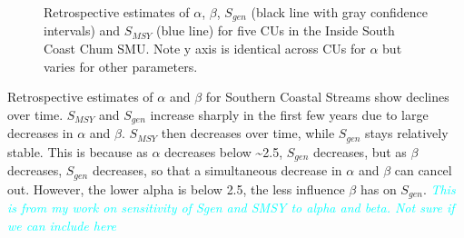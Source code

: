 \documentclass[11pt]{book}
\begin{document}
\begin{figure}[htb]

{\centering {} 

}

\caption{Retrospective estimates of $\alpha$, $\beta$, $S_{gen}$ (black line with gray confidence intervals) and $S_{MSY}$ (blue line) for five CUs in the Inside South Coast Chum SMU. Note y axis is identical across CUs for $\alpha$ but varies for other parameters.}\label{fig:chum-a-b-SMSY-Sgen-retro}
\end{figure}
Retrospective estimates of \(\alpha\) and \(\beta\) for Southern Coastal Streams show declines over time. \(S_{MSY}\) and \(S_{gen}\) increase sharply in the first few years due to large decreases in \(\alpha\) and \(\beta\). \(S_{MSY}\) then decreases over time, while \(S_{gen}\) stays relatively stable. This is because as \(\alpha\) decreases below \textasciitilde2.5, \(S_{gen}\) decreases, but as \(\beta\) decreases, \(S_{gen}\) decreases, so that a simultaneous decrease in \(\alpha\) and \(\beta\) can cancel out. However, the lower alpha is below 2.5, the less influence \(\beta\) has on \(S_{gen}\). \emph{\textcolor{cyan}{This is from my work on sensitivity of Sgen and SMSY to alpha and beta. Not sure if we can include here}}
\end{document}

